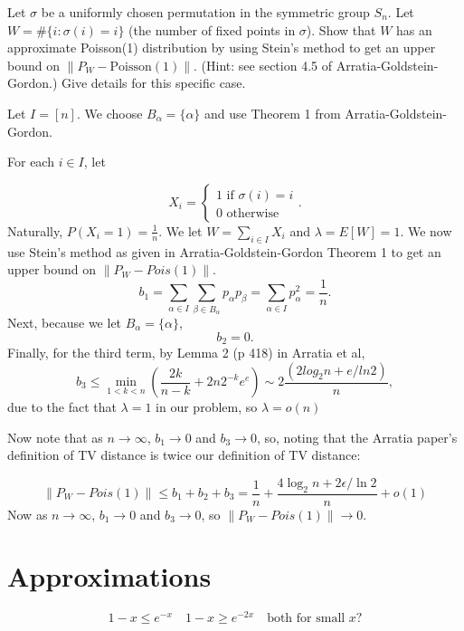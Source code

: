 \documentclass{article}
\newcommand{\answer}[1]{%
  \begin{tcolorbox}[
    colback=gray!9.8,
    boxrule=0.5pt,
    breakable]
  \small #1
  \end{tcolorbox}}
\begin{document}
\begin{example}
    Let $\sigma$ be a uniformly chosen permutation in the symmetric group $S_n$. Let $W = \#\{i : \sigma(i) = i\}$ (the number of fixed points in $\sigma$). Show that $W$ has an approximate Poisson(1) distribution by using Stein's method to get an upper bound on $\|P_W - \text{Poisson}(1)\|$. (Hint: see section 4.5 of Arratia-Goldstein-Gordon.) Give details for this specific case.

\answer{
Let $I = [n]$. We choose $B_\alpha = \{\alpha\}$ and use Theorem 1 from Arratia-Goldstein-Gordon. 

For each $i\in I$, let

$$X_i = \begin{cases}
    1 \text{ if } \sigma(i) = i\\
    0 \text{ otherwise}
\end{cases}.$$
Naturally, $P(X_i =1) = \frac{1}{n}$. We let $W = \sum_{i\in I} X_i$ and $\lambda = E[W] = 1$. We now use Stein's method as given in Arratia-Goldstein-Gordon Theorem 1 to get an upper bound on $\lVert P_W - Pois(1)\rVert$.
$$b_1 = \sum_{\alpha\in I} \sum_{\beta \in B_\alpha} p_\alpha p_\beta = \sum_{\alpha \in I} p_\alpha^2 = \frac{1}{n}.$$
Next, because we let $B_\alpha = \{\alpha\}$, 
$$b_2 = 0.$$
Finally, for the third term, by Lemma 2 (p 418) in Arratia et al,
$$b_3 \leq \min_{1<k<n} (\frac{2k}{n-k} + 2n 2^{-k} e^{e})\sim 2\frac{(2log_2 n + e/ln 2)}{n},$$
due to the fact that $\lambda=1$ in our problem, so $\lambda = o(n)$

Now note that as $n\to \infty$, $b_1\to 0$ and $b_3\to 0$, so, noting that the Arratia paper's definition of TV distance is twice our definition of TV distance:

$$\lVert P_W - Pois(1)\rVert\leq b_1 + b_2 + b_3 = \frac{1}{n} + \frac{4\log_2 n + 2\epsilon/\ln 2}{n} + o(1)$$
Now as $n\to \infty$, $b_1 \to 0$ and $b_3 \to 0$, so $\lVert P_W - Pois(1)\rVert \to 0$. 
}
\end{example}

\begin{example}
    
\end{example}



\newpage 
\section{Approximations}
$$1-x \leq e^{-x} \quad 1-x\geq e^{-2x} \quad \text{both for small } x?$$  
\end{document}
